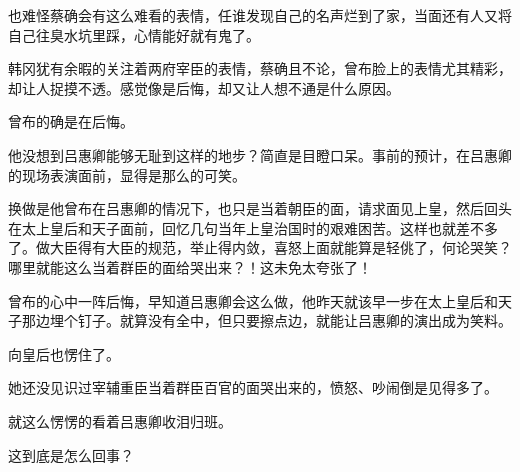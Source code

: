 也难怪蔡确会有这么难看的表情，任谁发现自己的名声烂到了家，当面还有人又将自己往臭水坑里踩，心情能好就有鬼了。

韩冈犹有余暇的关注着两府宰臣的表情，蔡确且不论，曾布脸上的表情尤其精彩，却让人捉摸不透。感觉像是后悔，却又让人想不通是什么原因。

曾布的确是在后悔。

他没想到吕惠卿能够无耻到这样的地步？简直是目瞪口呆。事前的预计，在吕惠卿的现场表演面前，显得是那么的可笑。

换做是他曾布在吕惠卿的情况下，也只是当着朝臣的面，请求面见上皇，然后回头在太上皇后和天子面前，回忆几句当年上皇治国时的艰难困苦。这样也就差不多了。做大臣得有大臣的规范，举止得内敛，喜怒上面就能算是轻佻了，何论哭笑？哪里就能这么当着群臣的面给哭出来？！这未免太夸张了！

曾布的心中一阵后悔，早知道吕惠卿会这么做，他昨天就该早一步在太上皇后和天子那边埋个钉子。就算没有全中，但只要擦点边，就能让吕惠卿的演出成为笑料。

向皇后也愣住了。

她还没见识过宰辅重臣当着群臣百官的面哭出来的，愤怒、吵闹倒是见得多了。

就这么愣愣的看着吕惠卿收泪归班。

这到底是怎么回事？

